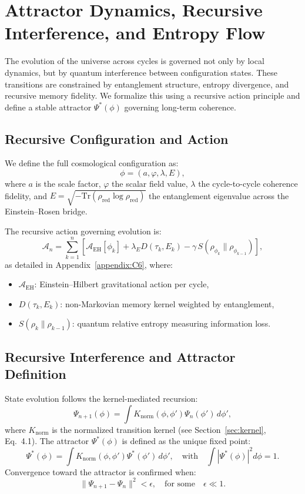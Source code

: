 \section{Attractor Dynamics, Recursive Interference, and Entropy Flow}
\label{sec:recursive-variational}

The evolution of the universe across cycles is governed not only by local dynamics, but by quantum interference between configuration states. These transitions are constrained by entanglement structure, entropy divergence, and recursive memory fidelity. We formalize this using a recursive action principle and define a stable attractor \( \Psi^*(\phi) \) governing long-term coherence.

\subsection{Recursive Configuration and Action}
\label{subsec:recursive-action}

We define the full cosmological configuration as:
\[
\phi = (a, \varphi, \lambda, E),
\]
where \( a \) is the scale factor, \( \varphi \) the scalar field value, \( \lambda \) the cycle-to-cycle coherence fidelity, and \( E = \sqrt{-\mathrm{Tr}(\rho_{\text{red}} \log \rho_{\text{red}})} \) the entanglement eigenvalue across the Einstein–Rosen bridge.

The recursive action governing evolution is:
\begin{equation}
\mathcal{A}_n = \sum_{k=1}^n \left[ \mathcal{A}_{\text{EH}}[\phi_k] + \lambda_E D(\tau_k, E_k) - \gamma \, S(\rho_{\phi_k} \| \rho_{\phi_{k-1}}) \right],
\end{equation}
as detailed in Appendix~\ref{appendix:C6}, where:
\begin{itemize}
    \item \( \mathcal{A}_{\text{EH}} \): Einstein–Hilbert gravitational action per cycle,
    \item \( D(\tau_k, E_k) \): non-Markovian memory kernel weighted by entanglement,
    \item \( S(\rho_k \| \rho_{k-1}) \): quantum relative entropy measuring information loss.
\end{itemize}

\subsection{Recursive Interference and Attractor Definition}
\label{subsec:attractor}

State evolution follows the kernel-mediated recursion:
\[
\Psi_{n+1}(\phi) = \int K_{\text{norm}}(\phi, \phi') \Psi_n(\phi') \, d\phi',
\]
where \( K_{\text{norm}} \) is the normalized transition kernel (see Section~\ref{sec:kernel}, Eq.~4.1). The attractor \( \Psi^*(\phi) \) is defined as the unique fixed point:
\[
\Psi^*(\phi) = \int K_{\text{norm}}(\phi, \phi') \Psi^*(\phi') \, d\phi', \quad \text{with} \quad \int |\Psi^*(\phi)|^2 d\phi = 1.
\]
Convergence toward the attractor is confirmed when:
\[
\| \Psi_{n+1} - \Psi_n \|^2 < \epsilon, \quad \text{for some} \quad \epsilon \ll 1.
\]

